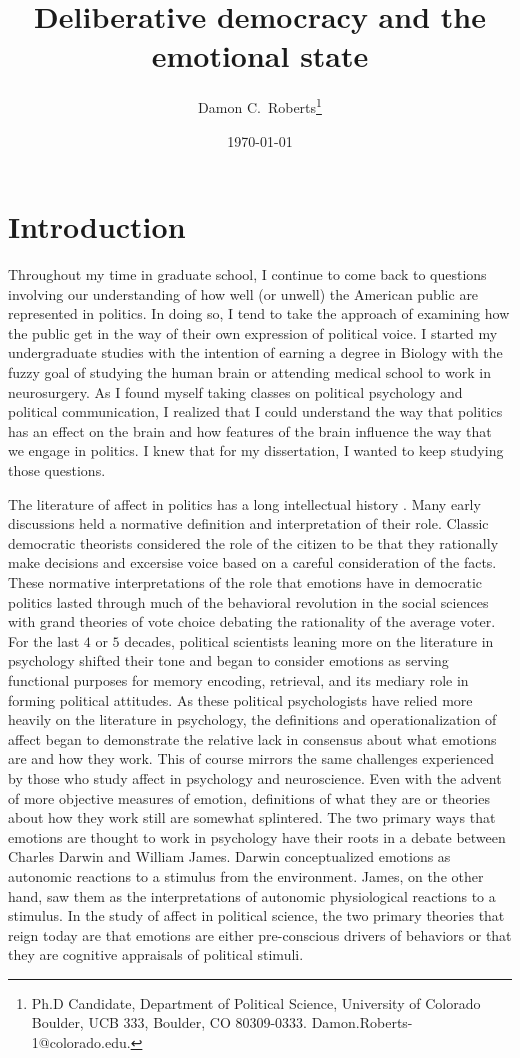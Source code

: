\documentclass [12pt]{article}
\title{Deliberative democracy and the emotional state}
\author{Damon C.\ Roberts\footnote{Ph.D Candidate,
Department of Political Science, University of Colorado Boulder, UCB 333, Boulder, CO 80309-0333. Damon.Roberts-1@colorado.edu.}}
\date{\today}
\begin{document}
\maketitle


\newpage
\doublespace
\newpage
\section*{Introduction}
Throughout my time in graduate school, I continue to come back to questions involving our understanding of how well (or unwell) the American public are represented in politics. In doing so, I tend to take the approach of examining how the public get in the way of their own expression of political voice. I started my undergraduate studies with the intention of earning a degree in Biology with the fuzzy goal of studying the human brain or attending medical school to work in neurosurgery. As I found myself taking classes on political psychology and political communication, I realized that I could understand the way that politics has an effect on the brain and how features of the brain influence the way that we engage in politics. I knew that for my dissertation, I wanted to keep studying those questions.

The literature of affect in politics has a long intellectual history \citep[see][for a discussion]{marcus_2000_arps}. Many early discussions held a normative definition and interpretation of their role. Classic democratic theorists considered the role of the citizen to be that they rationally make decisions and excersise voice based on a careful consideration of the facts. These normative interpretations of the role that emotions have in democratic politics lasted through much of the behavioral revolution in the social sciences with grand theories of vote choice debating the rationality of the average voter. For the last $4$ or $5$ decades, political scientists leaning more on the literature in psychology shifted their tone and began to consider emotions as serving functional purposes for memory encoding, retrieval, and its mediary role in forming political attitudes. As these political psychologists have relied more heavily on the literature in psychology, the definitions and operationalization of affect began to demonstrate the relative lack in consensus about what emotions are and how they work. This of course mirrors the same challenges experienced by those who study affect in psychology and neuroscience. Even with the advent of more objective measures of emotion, definitions of what they are or theories about how they work still are somewhat splintered. The two primary ways that emotions are thought to work in psychology have their roots in a debate between Charles Darwin and William James. Darwin conceptualized emotions as autonomic reactions to a stimulus from the environment. James, on the other hand, saw them as the interpretations of autonomic physiological reactions to a stimulus. In the study of affect in political science, the two primary theories that reign today are that emotions are either pre-conscious drivers of behaviors or that they are cognitive appraisals of political stimuli. 
\end{document}

